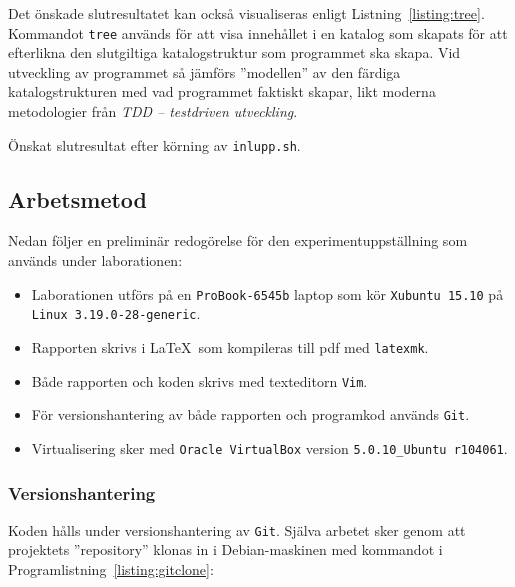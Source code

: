 Det önskade slutresultatet kan också visualiseras enligt
Listning~\ref{listing:tree}. Kommandot \texttt{tree} används för att visa
innehållet i en katalog som skapats för att efterlikna den slutgiltiga
katalogstruktur som programmet ska skapa.  Vid utveckling av programmet så
jämförs ''modellen'' av den färdiga katalogstrukturen med vad programmet
faktiskt skapar, likt moderna metodologier från \emph{TDD -- testdriven
utveckling}.

\begin{listing}[H]
\caption{Önskat slutresultat efter körning av \texttt{inlupp.sh}.}
\label{listing:tree}
\end{listing}



\subsection{Arbetsmetod}

Nedan följer en preliminär redogörelse för den experimentuppställning som används
under laborationen:

\begin{itemize}
  \item Laborationen utförs på en \texttt{ProBook-6545b} laptop som kör
        \texttt{Xubuntu 15.10} på \texttt{Linux 3.19.0-28-generic}.

  \item Rapporten skrivs i \LaTeX\  som kompileras till pdf med \texttt{latexmk}.

  \item Både rapporten och koden skrivs med texteditorn \texttt{Vim}.

  \item För versionshantering av både rapporten och programkod används \texttt{Git}.

  \item Virtualisering sker med \texttt{Oracle VirtualBox} version
        \texttt{5.0.10\_Ubuntu r104061}.
\end{itemize}

\subsubsection{Versionshantering}
Koden hålls under versionshantering av \texttt{Git}. Själva arbetet sker genom
att projektets ''repository'' klonas in i Debian-maskinen med kommandot i
Programlistning~\ref{listing:gitclone}:

